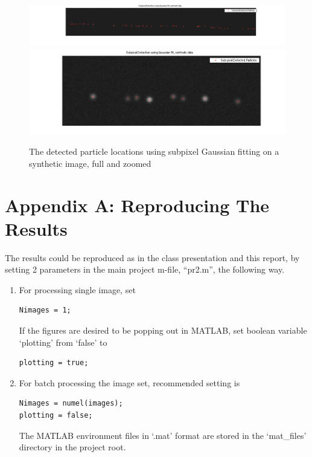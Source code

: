 \documentclass{article}
\begin{document}
\begin{figure}[H]
\centering
\includegraphics[width=16cm]{figures/subpixel_synthetic_full.png}
\includegraphics[width=16cm]{figures/subpixel_synthetic_zoom.png}
\caption{The detected particle locations using subpixel Gaussian fitting on a
    synthetic image, full and zoomed}
\label{fig:subpixelSynthetic}
\end{figure}



\pagebreak
\section*{Appendix A: Reproducing The Results}
 
The results could be reproduced as in the class presentation and this report, by setting 2 parameters in the main project m-file, ``pr2.m'', the following way.
\begin{enumerate}
\item For processing single image, set
\begin{verbatim}
Nimages = 1;
\end{verbatim}
If the figures are desired to be popping out in MATLAB, set boolean variable `plotting' from `false' to
\begin{verbatim}
plotting = true;
\end{verbatim}
\item For batch processing the image set, recommended setting is
\begin{verbatim}
Nimages = numel(images);
plotting = false;
\end{verbatim}
The MATLAB environment files in `.mat' format are stored in the `mat\_files' directory in the project root.
\end{enumerate}
 
\end{document}
